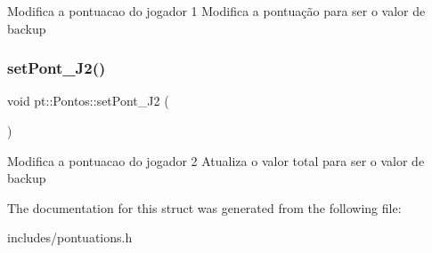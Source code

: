 Modifica a pontuacao do jogador 1 Modifica a pontuação para ser o valor de backup \mbox{\label{structpt_1_1Pontos_abc47bf57aa38fe3b6834bdc2ed068fe4}} 
\subsubsection{\texorpdfstring{set\+Pont\+\_\+\+J2()}{setPont\_J2()}}
{\footnotesize\ttfamily void pt\+::\+Pontos\+::set\+Pont\+\_\+\+J2 (\begin{DoxyParamCaption}{ }\end{DoxyParamCaption})\hspace{0.3cm}{\ttfamily [inline]}}

Modifica a pontuacao do jogador 2 Atualiza o valor total para ser o valor de backup 

The documentation for this struct was generated from the following file\+:\begin{DoxyCompactItemize}
\item 
includes/pontuations.\+h\end{DoxyCompactItemize}
